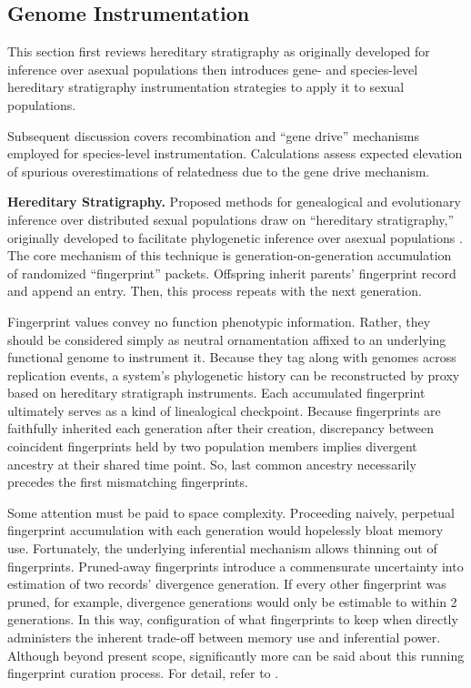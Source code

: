 \subsection{Genome Instrumentation}
\label{sec:genome-instrumentation}

This section first reviews hereditary stratigraphy as originally developed for inference over asexual populations then introduces gene- and species-level hereditary stratigraphy instrumentation strategies to apply it to sexual populations.

Subsequent discussion covers recombination and ``gene drive'' mechanisms employed for species-level instrumentation.
Calculations assess expected elevation of spurious overestimations of relatedness due to the gene drive mechanism.


% 
% 
\textbf{Hereditary Stratigraphy.}
Proposed methods for genealogical and evolutionary inference over distributed sexual populations draw on ``hereditary stratigraphy,'' originally developed to facilitate phylogenetic inference over asexual populations \citep{moreno2022hstrat}.
The core mechanism of this technique is generation-on-generation accumulation of randomized ``fingerprint'' packets.
Offspring inherit parents' fingerprint record and append an entry.
Then, this process repeats with the next generation.

Fingerprint values convey no function phenotypic information.
Rather, they should be considered simply as neutral ornamentation affixed to an underlying functional genome to instrument it.
Because they tag along with genomes across replication events, a system's phylogenetic history can be reconstructed by proxy based on
 hereditary stratigraph instruments.
Each accumulated fingerprint ultimately serves as a kind of linealogical checkpoint.
Because fingerprints are faithfully inherited each generation after their creation, discrepancy between coincident fingerprints held by two population members implies divergent ancestry at their shared time point.
So, last common ancestry necessarily precedes the first mismatching fingerprints.

Some attention must be paid to space complexity.
Proceeding naively, perpetual fingerprint accumulation with each generation would hopelessly bloat memory use.
Fortunately, the underlying inferential mechanism allows thinning out of fingerprints.
Pruned-away fingerprints introduce a commensurate uncertainty into estimation of two records' divergence generation.
If every other fingerprint was pruned, for example, divergence generations would only be estimable to within 2 generations.
In this way, configuration of what fingerprints to keep when directly administers the inherent trade-off between memory use and inferential power.
Although beyond present scope, significantly more can be said about this running fingerprint curation process.
For detail, refer to \citep{moreno2022hereditary}.

